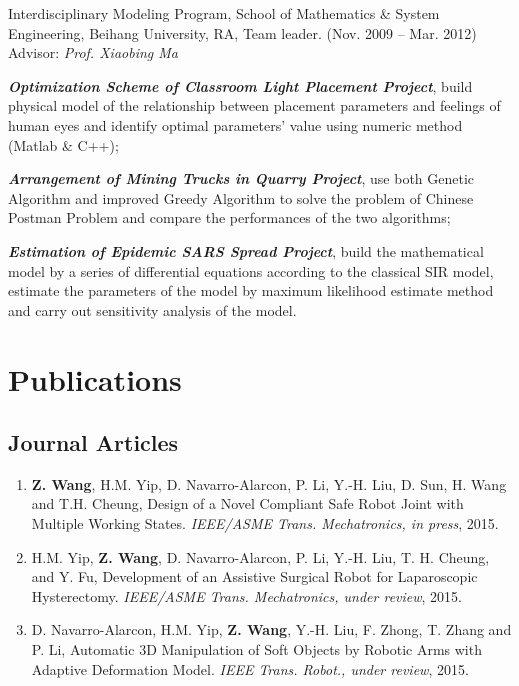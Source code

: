 \documentclass[10pt,letterpaper]{article}
\renewenvironment{itemize}{
  \begin{list}{}{
    \setlength{\leftmargin}{1.5em}
    \setlength{\itemsep}{0.25em}
    \setlength{\parskip}{0pt}
    \setlength{\parsep}{0.25em}
  }
}{
  \end{list}
}
\begin{document}
\begin{itemize}
  \item Interdisciplinary Modeling Program, School of Mathematics \& System Engineering, Beihang University, RA, Team leader. (Nov. 2009 -- Mar. 2012) \\
    Advisor: \textit{Prof. Xiaobing Ma}
  \begin{itemize}
    \item \textbf{\textit{Optimization Scheme of Classroom Light Placement Project}}, build physical model of the relationship between placement parameters and feelings of human eyes and identify optimal parameters' value using numeric method (Matlab \& C++);
    \item \textit{\textbf{Arrangement of Mining Trucks in Quarry Project}}, use both Genetic Algorithm and improved Greedy Algorithm to solve the problem of Chinese Postman Problem and compare the performances of the two algorithms;
    \item \textbf{\textit{Estimation of Epidemic SARS Spread Project}}, build the mathematical model by a series of differential equations according to the classical SIR model, estimate the parameters of the model by maximum likelihood estimate method and carry out sensitivity analysis of the model.
  \end{itemize}
\end{itemize}

\newpage
\section*{Publications}

\subsection*{Journal Articles}
\begin{enumerate}
\item \textbf{Z. Wang}, H.M. Yip, D. Navarro-Alarcon, P. Li, Y.-H. Liu, D. Sun, H. Wang and T.H. Cheung,
  Design of a Novel Compliant Safe Robot Joint with Multiple Working States.
  \textit{{IEEE/ASME} Trans. Mechatronics, in press}, 2015.
\item H.M. Yip, \textbf{Z. Wang}, D. Navarro-Alarcon, P. Li, Y.-H. Liu, T. H. Cheung, and Y. Fu,
  Development of an Assistive Surgical Robot for Laparoscopic Hysterectomy.
  \textit{{IEEE/ASME} Trans. Mechatronics, under review}, 2015.
\item D. Navarro-Alarcon, H.M. Yip, \textbf{Z. Wang}, Y.-H. Liu, F. Zhong, T. Zhang and P. Li,
  Automatic 3D Manipulation of Soft Objects by Robotic Arms with Adaptive Deformation Model.
  \textit{{IEEE} Trans. Robot., under review}, 2015.
\end{enumerate}
\end{document}
